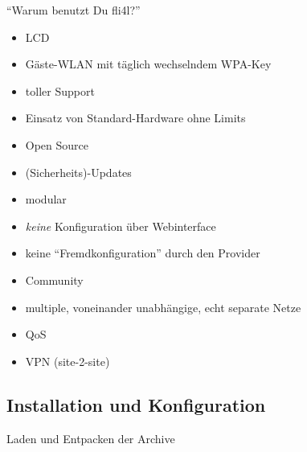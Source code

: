 \documentclass[t]{beamer}
\begin{document}
\begin{frame}{\enquote{Warum benutzt Du fli4l?}}
    \begin{itemize}
        \item LCD
        \item Gäste-WLAN mit täglich wechselndem WPA-Key
        \item toller Support
        \item Einsatz von Standard-Hardware ohne Limits
        \item Open Source
        \item (Sicherheits)-Updates
        \item modular
        \item \emph{keine} Konfiguration über Webinterface
        \item keine \enquote{Fremdkonfiguration} durch den Provider
        \item Community
        \item multiple, voneinander unabhängige, echt separate Netze
        \item QoS
        \item VPN (site-2-site)
    \end{itemize}
\end{frame}

\subsection{Installation und Konfiguration}

\begin{frame}{Laden und Entpacken der Archive}
    \begin{figure}
    \end{figure}
\end{frame}
\end{document}
